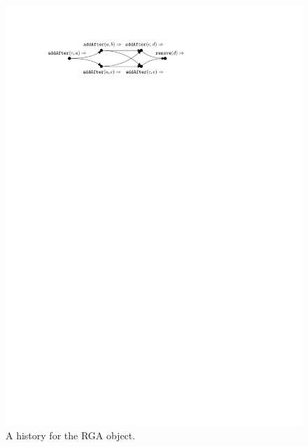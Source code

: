
\begin{figure}
  \includegraphics[scale=.7]{figures/history-RGA}
  \caption{A history for the RGA object.}
  \label{fig:rga-history}
\end{figure}

